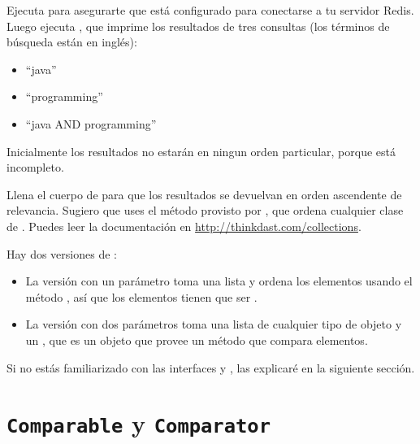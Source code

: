 \documentclass[12pt]{book}
\theoremstyle{exercise}
\begin{document}

Ejecuta  para asegurarte que está configurado para
conectarse a tu servidor Redis. Luego ejecuta , que imprime los
resultados de tres consultas (los términos de búsqueda están en inglés):

\begin{itemize}

\item
  ``java''

\item
  ``programming''

\item
  ``java AND programming''

\end{itemize}

Inicialmente los resultados no estarán en ningun orden particular, porque
 está incompleto.


Llena el cuerpo de  para que los resultados se devuelvan en
orden ascendente de relevancia. Sugiero que uses el método 
provisto por , que ordena cualquier clase de
. Puedes leer la documentación en
\url{http://thinkdast.com/collections}.

Hay dos versiones de :

\begin{itemize}

\item
  La versión con un parámetro toma una lista y ordena los elementos usando
  el método , así que los elementos tienen que ser
  .

\item
  La versión con dos parámetros toma una lista de cualquier tipo de objeto
  y un , que es un objeto que provee un método
   que compara elementos.

\end{itemize}


Si no estás familiarizado con las interfaces  y
, las explicaré en la siguiente sección.


\section{{\tt Comparable} y {\tt Comparator}}
\label{comparable-and-comparator}
\end{document}
